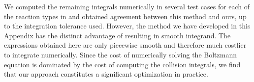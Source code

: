 We computed the remaining integrals numerically in several test cases for each of the reaction types in  and obtained agreement between this method and ours, up to the integration tolerance used.  However, the method we have developed in this Appendix has the distinct advantage of resulting in  smooth integrand.  The expressions obtained here are only piecewise smooth and therefore much costlier to integrate numerically.  Since the cost of numerically solving the Boltzmann equation is dominated by the cost of computing the collision integrals, we find that our approach constitutes a  significant optimization in practice.



